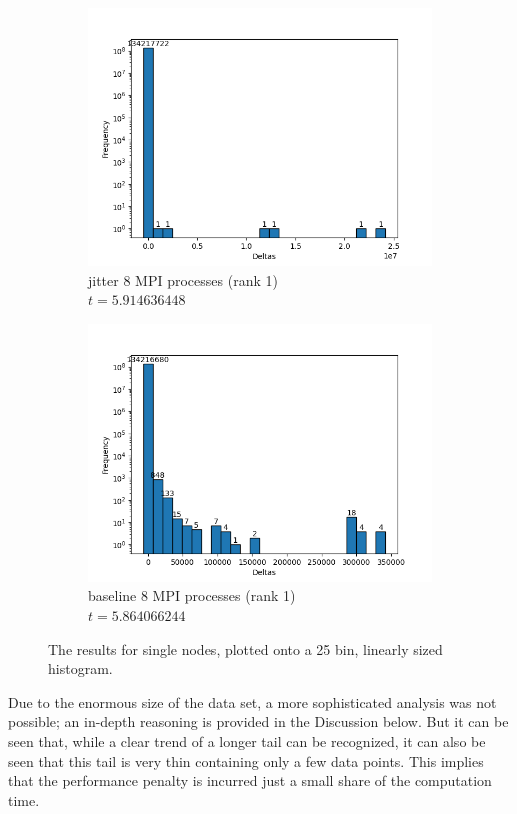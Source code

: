 \begin{figure}[H]
\begin{subfigure}{.42\textwidth}
  \centering
  \includegraphics[width=\textwidth]{./plots_jitter/jitter/output_size_8_rank_1_25.png}
  \caption{jitter 8 MPI processes (rank 1)\\$t=5.914636448$}
\end{subfigure}%
\begin{subfigure}{.42\textwidth}
  \centering
  \includegraphics[width=\textwidth]{./plots_jitter/jitter_baseline/output_size_8_rank_1_25.png}
  \caption{baseline 8 MPI processes (rank 1)\\$t=5.864066244$}
\end{subfigure}
\caption{The results for single nodes, plotted onto a 25 bin, linearly sized histogram.}
\end{figure}
Due to the enormous size of the data set, a more sophisticated analysis was not possible; an in-depth reasoning is provided in the Discussion below. But it can be seen that, while a clear trend of a longer tail can be recognized, it can also be seen that this tail is very thin containing only a few data points. This implies that the performance penalty is incurred just a small share of the computation time.

